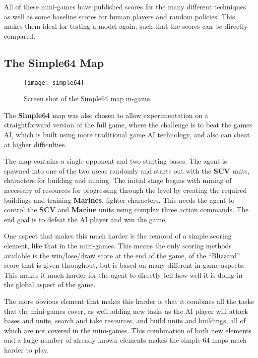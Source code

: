 All of these mini-games have published scores for the many different
techniques as well as some baseline scores for human players and random
policies. This makes them ideal for testing a model again, such that the scores can
be directly compared.

\subsection{The \textbf{Simple64} Map}

\begin{figure}[h!]
    \centering
    \texttt{[image: simple64]}
    \caption{Screen shot of the Simple64 map in-game.}%
    \label{fig:simple64}%
\end{figure}

The \textbf{Simple64} map was also chosen to allow experimentation on a
straightforward version of the full game, where the challenge is to beat the
games AI, which is built using more traditional game AI technology, and also can
cheat at higher difficulties.

The map contains a single opponent and two starting bases. The agent is spawned
into one of the two areas randomly and starts out with the \textbf{SCV} units,
characters for building and mining. The initial stage begins with mining of
necessary of resources for progressing through the level by creating the
required buildings and training \textbf{Marines}, fighter characters. This needs
the agent to control the \textbf{SCV} and \textbf{Marine} units using complex
three action commands. The end goal is to defeat the AI player and win the game.

One aspect that makes this much harder is the removal of a simple scoring
element, like that in the mini-games. This means the only scoring methods
available is the win/lose/draw score at the end of the game, of the ``Blizzard''
score that is given throughout, but is based on many different in-game aspects.
This makes it much harder for the agent to directly tell how well it is doing in
the global aspect of the game.

The more obvious element that makes this harder is that it combines all the
tasks that the mini-games cover, as well adding new tasks as the AI player will
attack bases and units, search and take resources, and build units and
buildings, all of which are not covered in the mini-games. This combination of
both new elements and a large number of already known elements makes the simple
64 maps much harder to play.

